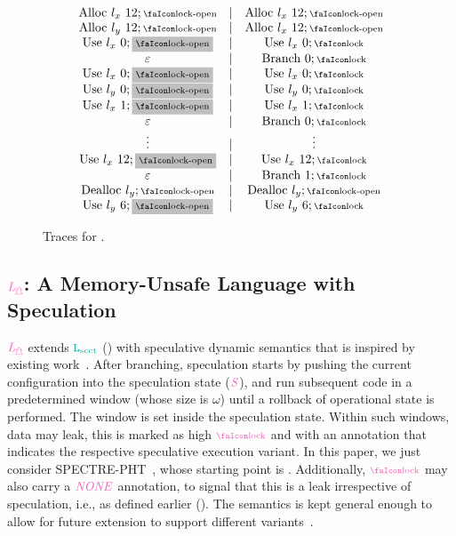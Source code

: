 \documentclass[acmsmall]{acmart}
\theoremstyle{definition}
\begin{document}
\begin{figure}[!htb]
$$\begin{array}{ccc}
     \ev{Alloc}\ \loc_{x}\ 12;\unlock & \mid & \ev{Alloc}\ \loc_{x}\ 12;\unlock\\
     \ev{Alloc}\ \loc_{y}\ 12;\unlock & \mid & \ev{Alloc}\ \loc_{x}\ 12;\unlock\\
     \ev{Use}\ \loc_{x}\ 0;\text{\colorbox{lightgray}{$\unlock$}} & \mid & \ev{Use}\ \loc_{x}\ 0;\lock\\
     \emptyevent & \mid & \ev{Branch}\ 0;\lock\\
     \ev{Use}\ \loc_{x}\ 0;\text{\colorbox{lightgray}{$\unlock$}} & \mid & \ev{Use}\ \loc_{x}\ 0;\lock\\
     \ev{Use}\ \loc_{y}\ 0;\text{\colorbox{lightgray}{$\unlock$}} & \mid & \ev{Use}\ \loc_{y}\ 0;\lock\\
     \ev{Use}\ \loc_{x}\ 1;\text{\colorbox{lightgray}{$\unlock$}} & \mid & \ev{Use}\ \loc_{x}\ 1;\lock\\
     \emptyevent & \mid & \ev{Branch}\ 0;\lock\\
     \vdots & \mid & \vdots \\
      \ev{Use}\ \loc_{x}\ 12;\text{\colorbox{lightgray}{$\unlock$}} & \mid & \ev{Use}\ \loc_{x}\ 12;\lock\\
      \emptyevent & \mid & \ev{Branch}\ 1;\lock\\
      \ev{Dealloc}\ \loc_{y};\unlock & \mid & \ev{Dealloc}\ \loc_{y};\unlock\\
      \ev{Use}\ \loc_{y}\ 6;\text{\colorbox{lightgray}{$\unlock$}} & \mid & \ev{Use}\ \loc_{y}\ 6;\lock\\
  \end{array}
  $$
  \caption{Traces for .}
  \label{fig:ex-cct}
\end{figure}


\subsection{$\Lspec$: A Memory-Unsafe Language with Speculation}\label{subsec:lspec}

$\Lspec$ extends $\Lscct$ () with speculative dynamic semantics that is inspired by existing work~\cite{guarnieri2018spectector,fabian2022automatic}.
After branching, speculation starts by pushing the current configuration into the speculation state ($\ird{S}$), and run subsequent code in a predetermined window (whose size is $\omega$) until a rollback of operational state is performed. 
The window is set inside the speculation state.
Within such windows, data may leak, this is marked as high $\ird{\lock}$ and with an annotation that indicates the respective speculative execution variant. 
In this paper, we just consider SPECTRE-PHT~\cite{kocher2019spectre}, whose starting point is . %
Additionally, $\ird{\lock}$ may also carry a $\ird{NONE}$ annotation, to signal that this is a leak irrespective of speculation, i.e., as defined earlier ().
The semantics is kept general enough to allow for future extension to support different variants~\cite{kocher2019spectre,maisuradze2018ret2spec,horn2019zero}.
\end{document}
